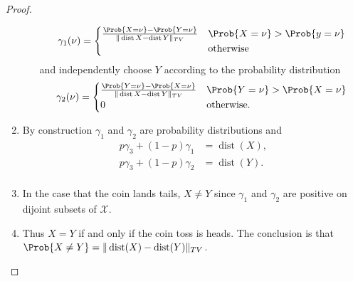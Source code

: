 \documentclass[12pt]{article}
\begin{document}
\begin{proof}
\begin{enumerate}
\begin{enumerate}
                    \[
                        \gamma_{1}(\nu) =
                        \begin{cases}
                            \frac{\Prob{X = \nu} - \Prob{Y = \nu}}{\|
                            \operatorname{dist}
                            {X} -
                            \operatorname{dist}
                            {Y} \|_{TV}} & \Prob{X = \nu} > \Prob{y =
                            \nu}\\
                            & \text{otherwise}
                        \end{cases}
                    \] and independently choose \( Y \) according to the
                    probability distribution
                    \[
                        \gamma_{2}(\nu) =
                        \begin{cases}
                            \frac{\Prob{Y = \nu} - \Prob{X = \nu}}{\|
                            \operatorname{dist}
                            {X} -
                            \operatorname{dist}
                            {Y} \|_{TV}} & \Prob{Y = \nu} > \Prob{X =
                            \nu}\\
                            0 & \text{otherwise}.
                        \end{cases}
                    \]
            \end{enumerate}
        \item
            By construction \( \gamma_1 \) and \( \gamma_2 \) are
            probability distributions and
            \begin{align*}
                p \gamma_3 + (1 -p) \gamma_1 &=
                \operatorname{dist}
                (X), \\
                p \gamma_3 + (1 -p) \gamma_2 &=
                \operatorname{dist}
                (Y).  \\
            \end{align*}
        \item
            In the case that the coin lands tails, \( X \ne Y \) since \(
            \gamma_1 \) and \( \gamma_2 \) are positive on dijoint
            subsets of \( \mathcal{X} \).
        \item
            Thus \( X = Y \) if and only if the coin toss is heads.  The
            conclusion is that \( \Prob{X \ne Y} = \|
            \operatorname{dist}
            (X) -
            \operatorname{dist}
            (Y)\|_ {TV} \).
    \end{enumerate}
\end{proof}
\end{document}

